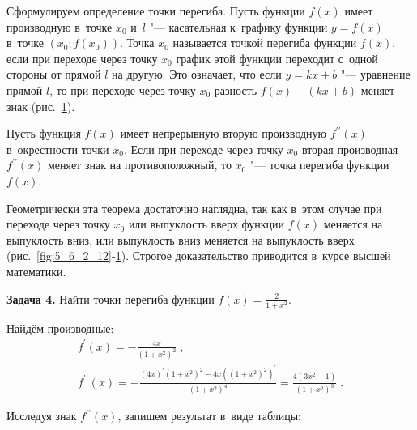Сформулируем определение точки перегиба. Пусть функции $f(x)$ имеет производную
в~точке $x_{0}$ и~$l$ "--- касательная к~графику функции $y = f(x)$
в~точке $\left( x_{0}; f(x_{0}) \right)$. Точка $x_{0}$ называется точкой перегиба
функции $f(x)$, если при переходе через точку $x_{0}$ график этой функции переходит
с~одной стороны от прямой $l$ на другую. Это означает, что если $y = kx + b$
"--- уравнение прямой $l$, то при переходе через точку $x_{0}$
разность $f(x) - (kx + b)$ меняет знак (рис.\ \ref{fig:5_6_2_14}).

\begin{figure}\label{fig:5_6_2_14}
\end{figure}

\begin{Th}\label{th:5_6_2_2}
Пусть функция $f(x)$ имеет непрерывную вторую производную $f^{\prime\prime} (x)$
в~окрестности точки $x_{0}$. Если при переходе через точку $x_{0}$ вторая производная
$f^{\prime\prime} (x)$ меняет знак на противоположный, то $x_{0}$ "--- точка
перегиба функции $f(x)$.
\end{Th}

Геометрически эта теорема достаточно наглядна, так как в~этом случае при переходе
через точку $x_{0}$ или выпуклость вверх функции $f(x)$ меняется на выпуклость вниз,
или выпуклость вниз меняется на выпуклость вверх (рис.\ \ref{fig:5_6_2_12}-\ref{fig:5_6_2_14}).
Строгое доказательство приводится в~курсе высшей математики.

\textbf{Задача 4.}\label{ex:5_6_4} Найти точки перегиба функции
$\displaystyle f(x) = \frac{2}{1 + x^{2}}$.

Найдём производные:
\begin{gather*}
\displaystyle f^\prime (x) = -\frac{4x}{\left( 1 + x^{2} \right)^{2}} \; , \\
\displaystyle f^{\prime\prime} (x) = 
-\frac{(4x)^\prime \left( 1 + x^{2} \right)^{2} - 4x\left( \left(1 + x^{2} \right)^{2} \right)^\prime}{\left( 1 + x^{2} \right)^{4}} =
\frac{4(3x^{2} - 1)}{\left( 1 + x^{2} \right)^{3}} \; .
\end{gather*}

Исследуя знак $f^{\prime\prime} (x)$, запишем результат в~виде таблицы:


